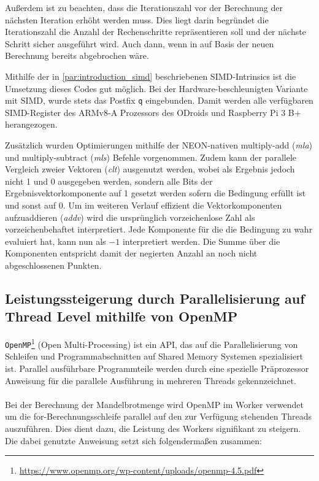 Außerdem ist zu beachten, dass die Iterationszahl vor der Berechnung der nächsten Iteration erhöht werden muss.
Dies liegt darin begründet die Iterationszahl die Anzahl der Rechenschritte repräsentieren soll und
der nächste Schritt sicher ausgeführt wird. Auch dann, wenn in auf Basis der neuen Berechnung bereits abgebrochen wäre.

\begin{figure}[h!]
	
\end{figure}

Mithilfe der in \autoref{par:introduction_simd} beschriebenen SIMD-Intrinsics ist die Umsetzung dieses Codes gut möglich.
Bei der Hardware-beschleunigten Variante mit SIMD, wurde stets das Postfix \verb|q| eingebunden.
Damit werden alle verfügbaren SIMD-Register des ARMv8-A Prozessors des ODroids und Raspberry Pi 3 B+ herangezogen.

Zusätzlich wurden Optimierungen mithilfe der NEON-nativen multiply-add (\textit{mla}) und multiply-subtract (\textit{mls}) Befehle vorgenommen.
Zudem kann der parallele Vergleich zweier Vektoren (\textit{clt}) ausgenutzt werden, wobei als Ergebnis jedoch nicht 1 und 0 ausgegeben werden,
sondern alle Bits der Ergebnisvektorkomponente auf 1 gesetzt werden sofern die Bedingung erfüllt ist und sonst auf 0.
Um im weiteren Verlauf effizient die Vektorkomponenten aufzuaddieren (\textit{addv}) wird die ursprünglich vorzeichenlose Zahl als vorzeichenbehaftet interpretiert.
Jede Komponente für die die Bedingung zu wahr evaluiert hat, kann nun als $-1$ interpretiert werden.
Die Summe über die Komponenten entspricht damit der negierten Anzahl an noch nicht abgeschlossenen Punkten.  

\subsection{Leistungssteigerung durch Parallelisierung auf Thread Level mithilfe von OpenMP}

\verb|OpenMP|\footnote{\url{https://www.openmp.org/wp-content/uploads/openmp-4.5.pdf}} (Open Multi-Processing) ist ein API, das auf die Parallelisierung von Schleifen und Programmabschnitten auf Shared Memory Systemen spezialisiert ist. Parallel ausführbare Programmteile werden durch eine spezielle Präprozessor Anweisung für die parallele Ausführung in mehreren Threads gekennzeichnet.
\\ \\
Bei der Berechnung der Mandelbrotmenge wird OpenMP im Worker verwendet um die for-Berechnungsschleife parallel auf den zur Verfügung stehenden Threads auszuführen. Dies dient dazu, die Leistung des Workers signifikant zu steigern. Die dabei genutzte Anweisung setzt sich folgendermaßen zusammen:

